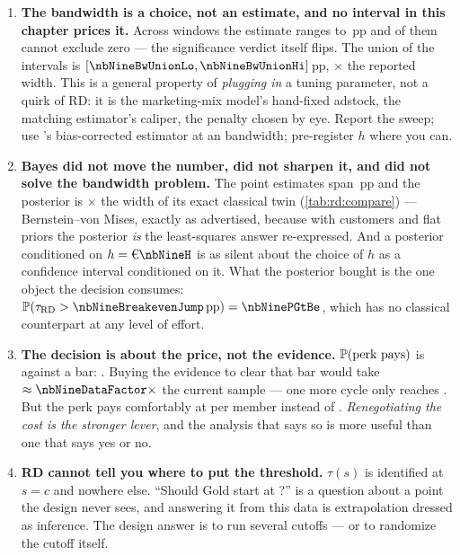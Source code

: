 \begin{enumerate}[leftmargin=*, itemsep=.45em]
  \item \textbf{The bandwidth is a choice, not an estimate, and no interval in this chapter prices
        it.} Across \nbNineBwNWindows{} windows the estimate ranges \nbNineBwEstLo{} to
        \nbNineBwEstHi{}\,pp and \nbNineBwNInsignif{} of them cannot exclude zero --- the
        significance verdict itself flips. The union of the intervals is
        $[\nbNineBwUnionLo, \nbNineBwUnionHi]$\,pp, \nbNineBwUnionOverWidth$\times$ the reported
        width. This is a general property of \emph{plugging in} a tuning parameter, not a quirk of
        RD: it is the marketing-mix model's hand-fixed adstock, the matching estimator's caliper,
        the penalty chosen by eye. Report the sweep; use \citeauthor{calonico2014}'s bias-corrected
        estimator at an \citeauthor{imbens2012} bandwidth; pre-register $h$ where you can.

  \item \textbf{Bayes did not move the number, did not sharpen it, and did not solve the bandwidth
        problem.} The point estimates span \nbNineEstSpan{}\,pp and the posterior is
        \nbNineWidthRatio$\times$ the width of its exact classical twin (\cref{tab:rd:compare}) ---
        Bernstein--von Mises, exactly as advertised, because with \nbNineNWindow{} customers and
        flat priors the posterior \emph{is} the least-squares answer re-expressed. And a posterior
        conditioned on $h = \eur{\nbNineH}$ is as silent about the choice of $h$ as a confidence
        interval conditioned on it. What the posterior bought is the one object the decision
        consumes: $\Prob(\tau_{\mathrm{RD}} > \nbNineBreakevenJump\,\text{pp}) = \nbNinePGtBe$, which
        has no classical counterpart at any level of effort.

  \item \textbf{The decision is about the price, not the evidence.} $\operatorname{\mathbb{P}}(\text{perk pays})$ is
        \nbNinePPays{} against a \nbNineActionBar{} bar: \textsc{\nbNineDecision}. Buying the
        evidence to clear that bar would take $\approx \nbNineDataFactor\times$ the current sample
        --- one more cycle only reaches \nbNinePPaysNext. But the perk pays comfortably at
        \eur{\nbNineBePerk} per member instead of \eur{\nbNinePerkCost}. \emph{Renegotiating the
        cost is the stronger lever}, and the analysis that says so is more useful than one that says
        yes or no.

  \item \textbf{RD cannot tell you where to put the threshold.} $\tau(s)$ is identified at $s = c$
        and nowhere else. ``Should Gold start at ?'' is a question about a point the design
        never sees, and answering it from this data is extrapolation dressed as inference. The
        design answer is to run several cutoffs --- or to randomize the cutoff itself.
\end{enumerate}

